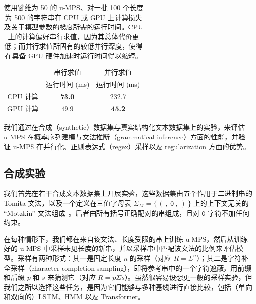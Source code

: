 \documentclass[twoside]{article}
\newcommand{\starchar}{0}
\begin{document}
%
\begin{table}[t]
\caption{使用键维为 50 的 u-MPS、对一批 100 个长度为 500 的字符串在 CPU 或 GPU 上计算损失及关于模型参数的梯度所需的运行时间。CPU 上的计算偏好串行求值，因为其总体代价更低；而并行求值所固有的较低并行深度，使得在具备 GPU 硬件加速时运行时间得以缩短。}
\label{tab:runtime}
\renewcommand{\arraystretch}{1.1}
\begin{center}
\begin{small}
\begin{sc}
\begin{tabular}{c|cc}
          & 串行求值 & 并行求值   \\
          & 运行时间 (ms)     & 运行时间 (ms) \\
\hline
CPU 计算 & \textbf{73.0}    & 232.7 \\
GPU 计算 & 49.9             & \textbf{45.2}  \\
\end{tabular}
\end{sc}
\end{small}
\end{center}
\vskip -0.1in
\end{table}

我们通过在合成（synthetic）数据集与真实结构化文本数据集上的实验，来评估 u-MPS 在概率序列建模与文法推断（grammatical inference）方面的性能，并验证 u-MPS 在并行化、正则表达式（regex）采样以及 regularization 方面的优势。

\subsection{合成实验}

我们首先在若干合成文本数据集上开展实验，这些数据集由五个作用于二进制串的 Tomita 文法，以及一个定义在三值字母表 $\Sigma_{M} = \{\mathtt{\ (\ ,\ \starchar\ ,\ )\ }\}$ 上的上下文无关的 ``Motzkin'' 文法组成~\citep{tomita1982, alexander2018}。后者由所有括号正确配对的串组成，且对 $\mathtt{\starchar}$ 字符不加任何约束。

在每种情形下，我们都在来自该文法、长度受限的串上训练 u-MPS，然后从训练好的 u-MPS 中采样未见长度的新串，并以采样串中匹配该文法的比例来评估模型。采样有两种形式：其一是固定长度 $n$ 的采样（对应 $R = \Sigma^n$）；其二是字符补全采样（character completion sampling），即将参考串中的一个字符遮蔽，用前缀和后缀 $p$ 和 $s$ 来猜测它（对应 $R = p \Sigma s$）。虽然很容易设想更一般的采样实验，但我们之所以选择这些任务，是因为它们能够与多种基线进行直接比较，包括（单向和双向的）LSTM、HMM 以及 Transformer。
\end{document}
